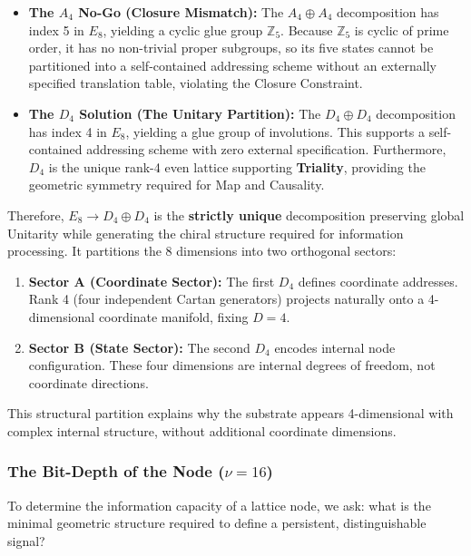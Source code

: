 \begin{itemize}
    \item \textbf{The \texorpdfstring{$A_4$}{A4} No-Go (Closure Mismatch):} The $A_4 \oplus A_4$ decomposition has index 5 in $E_8$, yielding a cyclic glue group $\mathbb{Z}_5$. Because $\mathbb{Z}_5$ is cyclic of prime order, it has no non-trivial proper subgroups, so its five states cannot be partitioned into a self-contained addressing scheme without an externally specified translation table, violating the Closure Constraint.
    
    \item \textbf{The \texorpdfstring{$D_4$}{D4} Solution (The Unitary Partition):} The $D_4 \oplus D_4$ decomposition has index 4 in $E_8$, yielding a glue group of involutions. This supports a self-contained addressing scheme with zero external specification. Furthermore, $D_4$ is the unique rank-4 even lattice supporting \textbf{Triality}, providing the geometric symmetry required for Map and Causality.
\end{itemize}

Therefore, $E_8 \to D_4 \oplus D_4$ is the \textbf{strictly unique} decomposition preserving global Unitarity while generating the chiral structure required for information processing. It partitions the 8 dimensions into two orthogonal sectors:

\begin{enumerate}
    \item \textbf{Sector A (Coordinate Sector):} The first $D_4$ defines coordinate addresses. Rank 4 (four independent Cartan generators) projects naturally onto a 4-dimensional coordinate manifold, fixing $D=4$.
    \item \textbf{Sector B (State Sector):} The second $D_4$ encodes internal node configuration. These four dimensions are internal degrees of freedom, not coordinate directions.
\end{enumerate}

This structural partition explains why the substrate appears 4-dimensional with complex internal structure, without additional coordinate dimensions.

\subsubsection{The Bit-Depth of the Node (\texorpdfstring{$\nu=16$}{nu=16})}
\label{sec:chiralcapacity}

To determine the information capacity of a lattice node, we ask: what is the minimal geometric structure required to define a persistent, distinguishable signal?

